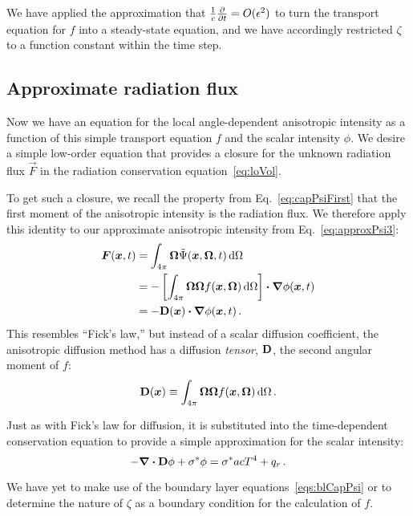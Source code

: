 We have applied the approximation that $\frac{1}{c}\frac{\partial }{\partial t}= O(\epsilon^2)$
to turn the transport equation for $f$ into a steady-state equation, and we have
accordingly restricted $\zeta$ to a function constant within the time step.

\subsection{Approximate radiation flux}
Now we have an equation for the local angle-dependent anisotropic intensity as a
function of this simple transport equation $f$ and the scalar intensity $\phi$.
We desire a simple low-order equation that provides a closure for the unknown
radiation flux $\vec{F}$ in the radiation conservation
equation~\eqref{eq:loVol}.

To get such a closure, we recall the property from Eq.~\eqref{eq:capPsiFirst}
that the first moment of the anisotropic intensity is the radiation flux. We
therefore apply this identity to our approximate anisotropic intensity from
Eq.~\eqref{eq:approxPsi3}:
\begin{align} \nonumber
  \bm{F}(\bm{x}, t)
  &= \int_{4\pi} \bm{\Omega} \tilde \Psi(\bm{x}, \bm{\Omega}, t) \mathop{}\!\mathrm{d}\Omega
  \\ \nonumber
  &= 
  - \left[ \int_{4\pi} \bm{\Omega} \bm{\Omega} f(\bm{x}, \bm{\Omega})
  \mathop{}\!\mathrm{d}\Omega \right]
  \bm{\cdot} \bm{\nabla} \phi(\bm{x},t)
  \\ \label{eq:anisotropicFicks}
  &= - \mathbf{D}(\bm{x}) \bm{\cdot} \bm{\nabla} \phi(\bm{x},t) \,.
\end{align}
This resembles ``Fick's law,'' but instead of a scalar diffusion coefficient,
the anisotropic diffusion method has a diffusion \emph{tensor}, $\mathbf{D}$, the
second angular moment of $f$:
\begin{equation}\label{eq:dDefinition}
  \mathbf{D}(\bm{x}) \equiv \int_{4\pi} \bm{\Omega} \bm{\Omega}
  f(\bm{x}, \bm{\Omega}) \mathop{}\!\mathrm{d}\Omega \,.
\end{equation}

Just as with Fick's law for diffusion, it is
substituted into the time-dependent conservation equation to provide a simple
approximation for the scalar intensity:
\begin{equation*}
  -\bm{\nabla} \bm{\cdot} \mathbf{D} \phi + \sigma^\ast \phi = \sigma^\ast ac T^4 + q_{r} \,.
\end{equation*}

We have yet to make use of the boundary layer equations~\eqref{eqs:blCapPsi} or
to determine the nature of $\zeta$ as a boundary condition for the calculation
of $f$.

